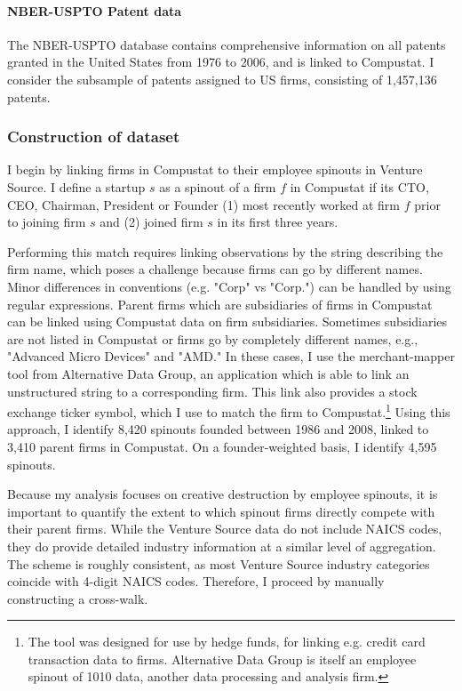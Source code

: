 \documentclass[11pt,english]{article}
\theoremstyle{remark}
\begin{document}
\paragraph{NBER-USPTO Patent data}

The NBER-USPTO database contains comprehensive information on all patents granted in the United States from 1976 to 2006, and is linked to Compustat. I consider the subsample of patents assigned to US firms, consisting of 1,457,136 patents. 

\subsubsection{Construction of dataset}

I begin by linking firms in Compustat to their employee spinouts in Venture Source. I define a startup $s$ as a spinout of a firm $f$ in Compustat if its CTO, CEO, Chairman, President or Founder (1) most recently worked at firm $f$ prior to joining firm $s$ and (2) joined firm $s$ in its first three years.

Performing this match requires linking observations by the string describing the firm name, which poses a challenge because firms can go by different names. Minor differences in conventions (e.g. "Corp" vs "Corp.") can be handled by using regular expressions. Parent firms which are subsidiaries of firms in Compustat can be linked using Compustat data on firm subsidiaries. Sometimes subsidiaries are not listed in Compustat or firms go by completely different names, e.g., "Advanced Micro Devices" and "AMD."  In these cases, I use the merchant-mapper tool from Alternative Data Group, an application which is able to link an unstructured string to a corresponding firm. This link also provides a stock exchange ticker symbol, which I use to match the firm to Compustat.\footnote{The tool was designed for use by hedge funds, for linking e.g. credit card transaction data to firms. Alternative Data Group is itself an employee spinout of 1010 data, another data processing and analysis firm.} Using this approach, I identify 8,420 spinouts founded between 1986 and 2008, linked to 3,410 parent firms in Compustat. On a founder-weighted basis, I identify 4,595 spinouts.

Because my analysis focuses on creative destruction by employee spinouts, it is important to quantify the extent to which spinout firms directly compete with their parent firms. While the Venture Source data do not include NAICS codes, they do provide detailed industry information at a similar level of aggregation. The scheme is roughly consistent, as most Venture Source industry categories coincide with 4-digit NAICS codes. Therefore, I proceed by manually constructing a cross-walk.
\end{document}
